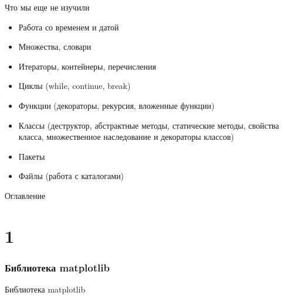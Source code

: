 \documentclass[12pt]{beamer}
\begin{document}
\begin{frame}{Что мы еще не изучили}
\begin{itemize}
\item Работа со временем и датой
\item Множества, словари
\item Итераторы, контейнеры, перечисления
\item Циклы (while, continue, break)
\item Функции (декораторы, рекурсия, вложенные функции)
\item Классы (деструктор, абстрактные методы, статические методы, свойства класса, множественное наследование и декораторы классов)
\item Пакеты
\item Файлы (работа с каталогами)
\end{itemize}
\end{frame}


\begin{frame}[t]{Оглавление}
\tableofcontents[part=1]
\end{frame}











\part{1}

\section{Библиотека matplotlib}
\begin{frame}{Библиотека matplotlib}
 \\
\vspace{0.3cm}
\href{https://matplotlib.org/}{}
\end{frame}
\end{document}
